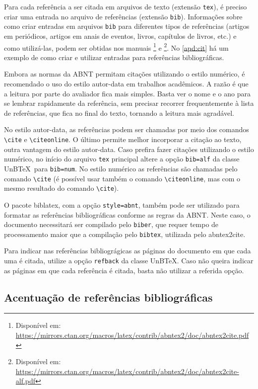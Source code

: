 Para cada referência a ser citada em arquivos de texto (extensão \texttt{tex}), é preciso criar uma entrada no arquivo de referências (extensão \texttt{bib}). Informações sobre como criar entradas em arquivos \texttt{bib} para diferentes tipos de referências (artigos em periódicos, artigos em anais de eventos, livros, capítulos de livros, etc.) e como utilizá-las, podem ser obtidas nos manuais \footnote{Disponível em: \url{https://mirrors.ctan.org/macros/latex/contrib/abntex2/doc/abntex2cite.pdf}} e \footnote{Disponível em: \url{https://mirrors.ctan.org/macros/latex/contrib/abntex2/doc/abntex2cite-alf.pdf}}. No \cref{apd:cit} há um exemplo de como criar e utilizar entradas para referências bibliográficas.

Embora as normas da ABNT permitam citações utilizando o estilo numérico, é recomendado o uso do estilo autor-data em trabalhos acadêmicos. A razão é que a leitura por parte do avaliador fica mais simples. Basta ver o nome e o ano para se lembrar rapidamente da referência, sem precisar recorrer frequentemente à lista de referências, que fica no final do texto, tornando a leitura mais agradável.

No estilo autor-data, as referências podem ser chamadas por meio dos comandos \verb|\cite| e \verb|\citeonline|. O último permite melhor incorporar a citação ao texto, outra vantagem do estilo autor-data. Caso prefira fazer citações utilizando o estilo numérico, no início do arquivo \texttt{tex} principal altere a opção \texttt{bib=alf} da classe UnB\TeX\ para \texttt{bib=num}. No estilo numérico as referências são chamadas pelo comando \verb|\cite| (é possível usar também o comando \verb|\citeonline|, mas com o mesmo resultado do comando \verb|\cite|).

O pacote \textsf{biblatex}, com a opção \texttt{style=abnt}, também pode ser utilizado para formatar as referências bibliográficas conforme as regras da ABNT. Neste caso, o documento necessitará ser compilado pelo \texttt{biber}, que requer tempo de processamento maior que a compilação pelo \texttt{bibtex}, utilizada pelo \textsf{abntex2cite}.

Para indicar nas referências bibliográgicas as páginas do documento em que cada uma é citada, utilize a opção \texttt{refback} da classe UnB\TeX. Caso não queira indicar as páginas em que cada referência é citada, basta não utilizar a referida opção.

\subsection{Acentuação de referências bibliográficas}

